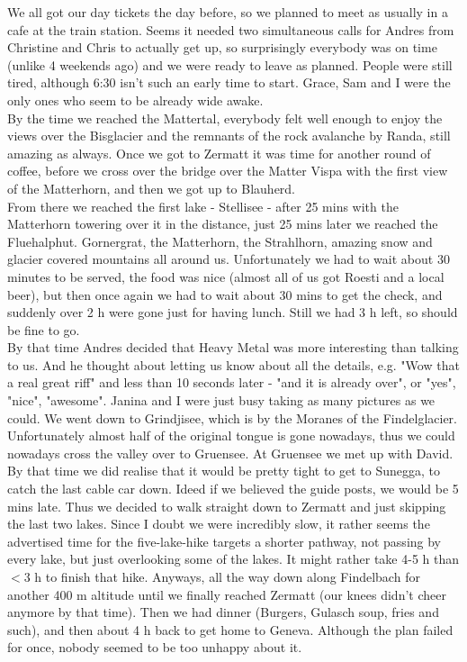 We all got our day tickets the day before, so we planned to meet as usually in a cafe at the train station. Seems it needed two simultaneous calls for Andres from Christine and Chris to actually get up, so surprisingly everybody was on time (unlike 4 weekends ago) and we were ready to leave as planned. People were still tired, although 6:30 isn't such an early time to start. Grace, Sam and I were the only ones who seem to be already wide awake.\\
 By the time we reached the Mattertal, everybody felt well enough to enjoy the views over the Bisglacier and the remnants of the rock avalanche by Randa, still amazing as always. Once we got to Zermatt it was time for another round of coffee, before we cross over the bridge over the Matter Vispa with the first view of the Matterhorn, and then we got up to Blauherd.\\
  From there we reached the first lake - Stellisee - after 25 mins with the Matterhorn towering over it in the distance, just 25 mins later we reached the Fluehalphut. Gornergrat, the Matterhorn, the Strahlhorn, amazing snow and glacier covered mountains all around us. Unfortunately we had to wait about 30 minutes to be served, the food was nice (almost all of us got Roesti and a local beer), but then once again we had to wait about 30 mins to get the check, and suddenly over 2 h were gone just for having lunch. Still we had 3 h left, so should be fine to go. \\
   By that time Andres decided that Heavy Metal was more interesting than talking to us. And he thought about letting us know about all the details, e.g. "Wow that a real great riff" and less than 10 seconds later - "and it is already over", or "yes", "nice", "awesome". Janina and I were just busy taking as many pictures as we could. We went down to Grindjisee, which is by the Moranes of the Findelglacier. Unfortunately almost half of the original tongue is gone nowadays, thus we could nowadays cross the valley over to Gruensee. At Gruensee we met up with David. By that time we did realise that it would be pretty tight to get to Sunegga, to catch the last cable car down. Ideed if we believed the guide posts, we would be 5 mins late. Thus we decided to walk straight down to Zermatt and just skipping the last two lakes. Since I doubt we were incredibly slow, it rather seems the advertised time for the five-lake-hike targets a shorter pathway, not passing by every lake, but  just overlooking some of the lakes. It might rather take 4-5 h than $<$3 h to finish that hike. Anyways, all the way down along Findelbach for another 400 m altitude until we finally reached Zermatt (our knees didn't cheer anymore by that time). Then we had dinner (Burgers, Gulasch soup, fries and such), and then about 4 h back to get home to Geneva. Although the plan failed for once, nobody seemed to be too unhappy about it.\\

